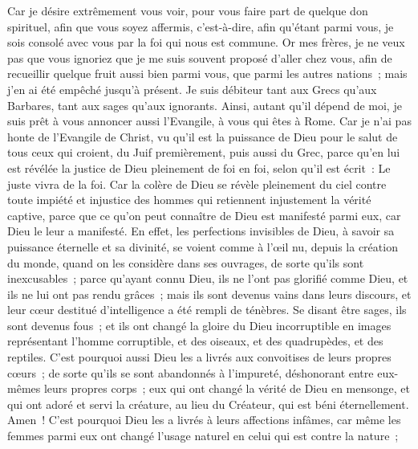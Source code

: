 \begin{multicols}{2}
Car je désire extrêmement vous voir, pour vous faire part de quelque don spirituel, afin que vous soyez affermis,
c'est-à-dire, afin qu'étant parmi vous, je sois consolé avec vous par la foi qui nous est commune.
Or mes frères, je ne veux pas que vous ignoriez que je me suis souvent proposé d'aller chez vous, afin de recueillir quelque fruit aussi bien parmi vous, que parmi les autres nations~; mais j'en ai été empêché jusqu'à présent.
Je suis débiteur tant aux Grecs qu'aux Barbares, tant aux sages qu'aux ignorants.
Ainsi, autant qu'il dépend de moi, je suis prêt à vous annoncer aussi l'Evangile, à vous qui êtes à Rome.
Car je n'ai pas honte de l'Evangile de Christ, vu qu'il est la puissance de Dieu pour le salut de tous ceux qui croient, du Juif premièrement, puis aussi du Grec,
parce qu'en lui est révélée la justice de Dieu pleinement de foi en foi, selon qu'il est écrit~: Le juste vivra de la foi.
Car la colère de Dieu se révèle pleinement du ciel contre toute impiété et injustice des hommes qui retiennent injustement la vérité captive,
parce que ce qu'on peut connaître de Dieu est manifesté parmi eux, car Dieu le leur a manifesté.
En effet, les perfections invisibles de Dieu, à savoir sa puissance éternelle et sa divinité, se voient comme à l'œil nu, depuis la création du monde, quand on les considère dans ses ouvrages, de sorte qu'ils sont inexcusables~;
parce qu'ayant connu Dieu, ils ne l'ont pas glorifié comme Dieu, et ils ne lui ont pas rendu grâces~; mais ils sont devenus vains dans leurs discours, et leur cœur destitué d'intelligence a été rempli de ténèbres.
Se disant être sages, ils sont devenus fous~;
et ils ont changé la gloire du Dieu incorruptible en images représentant l'homme corruptible, et des oiseaux, et des quadrupèdes, et des reptiles.
C'est pourquoi aussi Dieu les a livrés aux convoitises de leurs propres cœurs~; de sorte qu'ils se sont abandonnés à l'impureté, déshonorant entre eux-mêmes leurs propres corps~;
eux qui ont changé la vérité de Dieu en mensonge, et qui ont adoré et servi la créature, au lieu du Créateur, qui est béni éternellement. Amen~!
C'est pourquoi Dieu les a livrés à leurs affections infâmes, car même les femmes parmi eux ont changé l'usage naturel en celui qui est contre la nature~;

\end{multicols}
